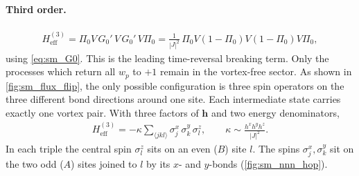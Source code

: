 \documentclass[
  aps,
  prl,
  preprint,
  amsmath,
  amssymb,
  superscriptaddress,
  floatfix
]{revtex4-2}
\renewcommand{\abs}[1]{\left| #1 \right|}
\begin{document}
\paragraph{Third order.}
\begin{align}
  H^{(3)}_{\text{eff}} = \Pi_0 V\, G_0'\, V\, G_0'\, V \Pi_0
  = \frac{1}{\abs{J}^2}\, \Pi_0 V (1-\Pi_0) V (1-\Pi_0) V \Pi_0 ,
\end{align}
using \cref{eq:sm_G0}. This is the leading time-reversal breaking term.
Only the processes which return all $w_p$ to $+1$ remain in the vortex-free
sector. As shown in \cref{fig:sm_flux_flip}, the only possible configuration
is three spin operators on the three different bond directions around one
site. Each intermediate state carries exactly one vortex pair. With three
factors of $\bm h$ and two energy denominators,
\begin{align}
  H^{(3)}_{\text{eff}} = -\kappa \sum_{\langle jkl\rangle} \sigma_j^x\, \sigma_k^y\, \sigma_l^z,
  \qquad
  \kappa \sim \frac{h^x h^y h^z}{\abs{J}^2}.
  \label{eq:sm_H3_spin}
\end{align}
In each triple the central spin $\sigma^z_l$ sits on an even ($B$)
site $l$. The spins $\sigma^x_j,\sigma^y_k$ sit on the two odd ($A$) sites
joined to $l$ by its $x$- and $y$-bonds (\cref{fig:sm_nnn_hop}).
\end{document}
